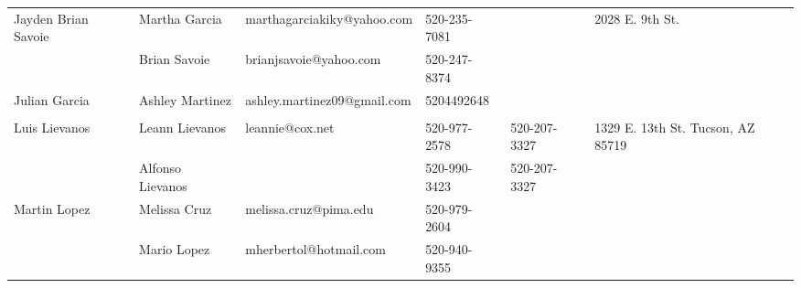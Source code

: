 \documentclass[landscape]{article}\usepackage[]{graphicx}\usepackage[]{color}
\begin{document}
\begin{longtable}{|p{100pt}|p{100pt}|p{140pt}|p{60pt}|p{64pt}|p{120pt}|}
 &  &  &  &  & \\
\hline
\multirow{2}{100pt}{Jayden Brian Savoie} & Martha Garcia & marthagarciakiky@yahoo.com & 520-235-7081 &  & \multirow{2}{120pt}{2028 E. 9th St.} \\
 & Brian Savoie & brianjsavoie@yahoo.com & 520-247-8374 &  & \\
\hline
\multirow{2}{100pt}{Julian Garcia} & Ashley Martinez & ashley.martinez09@gmail.com & 5204492648 &  & \multirow{2}{120pt}{} \\
 &  &  &  &  & \\
\hline
\multirow{2}{100pt}{Luis Lievanos} & Leann Lievanos & leannie@cox.net & 520-977-2578 & 520-207-3327 & \multirow{2}{120pt}{1329 E. 13th St. Tucson, AZ 85719} \\
 & Alfonso Lievanos &  & 520-990-3423 & 520-207-3327 & \\
\hline
\multirow{2}{100pt}{Martin Lopez} & Melissa Cruz & melissa.cruz@pima.edu & 520-979-2604 &  & \multirow{2}{120pt}{} \\
 & Mario Lopez & mherbertol@hotmail.com & 520-940-9355 &  & \\
\hline
\end{longtable}
\newpage
\end{document}
